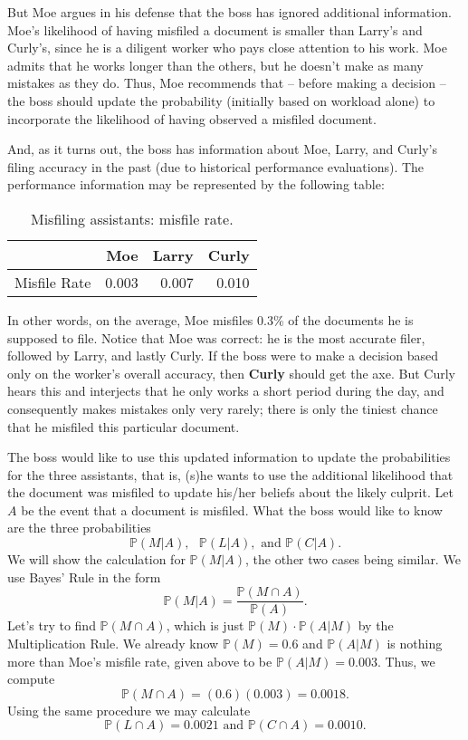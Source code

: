 But Moe argues in his defense that the boss has ignored additional
information. Moe's likelihood of having misfiled a document is smaller
than Larry's and Curly's, since he is a diligent worker who pays close
attention to his work. Moe admits that he works longer than the
others, but he doesn't make as many mistakes as they do. Thus, Moe
recommends that -- before making a decision -- the boss should update
the probability (initially based on workload alone) to incorporate the
likelihood of having observed a misfiled document.

And, as it turns out, the boss has information about Moe, Larry, and
Curly's filing accuracy in the past (due to historical performance
evaluations). The performance information may be represented by the
following table:

\begin{table}[htb]
\caption[Misfiling assistants: misfile rate]{Misfiling assistants: misfile rate.}
\centering
\begin{tabular}{lrrr}
 & Moe & Larry & Curly\\
\hline
Misfile Rate & 0.003 & 0.007 & 0.010\\
\end{tabular}
\end{table}

In other words, on the average, Moe misfiles 0.3\% of the documents he
is supposed to file. Notice that Moe was correct: he is the most
accurate filer, followed by Larry, and lastly Curly. If the boss were
to make a decision based only on the worker's overall accuracy,
then \textbf{Curly} should get the axe. But Curly hears this and interjects
that he only works a short period during the day, and consequently
makes mistakes only very rarely; there is only the tiniest chance that
he misfiled this particular document.

The boss would like to use this updated information to update the
probabilities for the three assistants, that is, (s)he wants to use
the additional likelihood that the document was misfiled to update
his/her beliefs about the likely culprit. Let \(A\) be the event that
a document is misfiled. What the boss would like to know are the three
probabilities
\[
\mathbb{P}(M|A),\mbox{ }\mathbb{P}(L|A),\mbox{ and }\mathbb{P}(C|A).
\]
We will show the calculation for \(\mathbb{P}(M|A)\), the other two
cases being similar. We use Bayes' Rule in the form
\[
\mathbb{P}(M|A)=\frac{\mathbb{P}(M\cap A)}{\mathbb{P}(A)}.
\]
Let's try to find \(\mathbb{P}(M\cap A)\), which is just
\(\mathbb{P}(M)\cdot\mathbb{P}(A|M)\) by the Multiplication Rule. We
already know \(\mathbb{P}(M)=0.6\) and \(\mathbb{P}(A|M)\) is nothing
more than Moe's misfile rate, given above to be
\(\mathbb{P}(A|M)=0.003\). Thus, we compute
\[
\mathbb{P}(M\cap A)=(0.6)(0.003)=0.0018.
\]
Using the same procedure we may calculate
\[
\mathbb{P}(L \cap A)=0.0021\mbox{ and }\mathbb{P}(C \cap A)=0.0010.
\]


